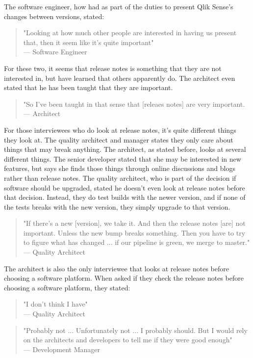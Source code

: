 \documentclass{cslthse-msc}
\begin{document}
    The software engineer, how had as part of the duties to present Qlik Sense's changes between versions, stated:
    \begin{quote}
        "Looking at how much other people are interested in having us present that, then it seem like it's quite important" \\
        --- Software Engineer
    \end{quote}
    For these two, it seems that release notes is something that they are not interested in, but have learned that others apparently do. The architect even stated that he has been taught that they are important.
    \begin{quote}
        "So I've been taught in that sense that [releaes notes] are very important. \\
        --- Architect
    \end{quote}
    For those interviewees who do look at release notes, it's quite different things they look at. The quality architect and manager states they only care about things that may break anything. The architect, as stated before, looks at several different things. The senior developer stated that she may be interested in new features, but says she finds those things through online discussions and blogs rather than release notes. The quality architect, who is part of the decision if software should be upgraded, stated he doesn't even look at release notes before that decision. Instead, they do test builds with the newer version, and if none of the tests breaks with the new version, they simply upgrade to that version.
    \begin{quote}
        "If there's a new [version], we take it. And then the release notes [are] not important. Unless the new bump breaks something. Then you have  to try to figure what has changed ... if our pipeline is green, we merge to master."\\
        --- Quality Architect
    \end{quote}
    The architect is also the only interviewee that looks at release notes before choosing a software platform.  When asked if they check the release notes before choosing a software platform, they stated:
    \begin{quote}
        "I don't think I have"\\
        --- Quality Architect
    \end{quote}
    \begin{quote}
        "Probably not ... Unfortunately not ... I probably should. But I would rely on the architects and developers to tell me if they were good enough" \\
        --- Development Manager
    \end{quote}
\end{document}
